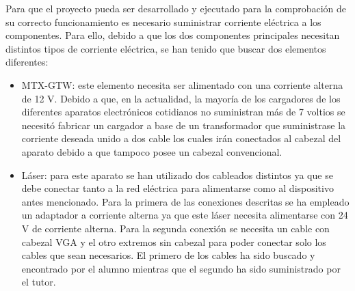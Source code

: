 Para que el proyecto pueda ser desarrollado y ejecutado para la comprobación de su correcto funcionamiento es necesario suministrar corriente eléctrica a los componentes. Para ello, debido a que los dos componentes principales necesitan distintos tipos de corriente eléctrica, se han tenido que buscar dos elementos diferentes:
\begin{itemize}
	\item MTX-GTW: este elemento necesita ser alimentado con una corriente alterna de 12 V. Debido a que, en la actualidad, la mayoría de los cargadores de los diferentes aparatos electrónicos cotidianos no suministran más de 7 voltios se necesitó fabricar un cargador a base de un transformador que suministrase la corriente deseada unido a dos cable los cuales irán conectados al cabezal del aparato debido a que tampoco posee un cabezal convencional.\\
	\item Láser: para este aparato se han utilizado dos cableados distintos ya que se debe conectar tanto a la red eléctrica para alimentarse como al dispositivo antes mencionado. Para la primera de las conexiones descritas se ha empleado un adaptador a corriente alterna ya que este láser necesita alimentarse con 24 V de corriente alterna. Para la segunda conexión se necesita un cable con cabezal VGA y el otro extremos sin cabezal para poder conectar solo los cables que sean necesarios. El primero de los cables ha sido buscado y encontrado por el alumno mientras que el segundo ha sido suministrado por el tutor.
\end{itemize}